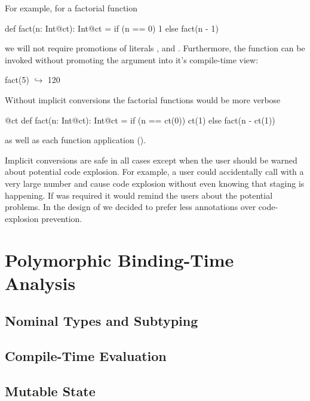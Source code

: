 For example, for a factorial function \begin{lstparagraph}
def fact(n: Int@ct): Int@ct =
  if (n == 0) 1 else fact(n - 1)
 \end{lstparagraph} we will not require promotions of literals , and . Furthermore,
 the function can be invoked without promoting the argument into it's compile-time view:\begin{lstparagraph}
fact(5)
  $\hookrightarrow$ 120
 \end{lstparagraph}

Without implicit conversions the factorial functions would be more verbose \begin{lstparagraph}
@ct def fact(n: Int@ct): Int@ct =
  if (n == ct(0)) ct(1) else fact(n - ct(1))
 \end{lstparagraph} as well as each function application ().

Implicit conversions are safe in all cases except when the user should be warned about potential
code explosion. For example, a user could accidentally call  with a very large number and
cause code explosion without even knowing that staging is happening. If  was required
it would remind the users about the potential problems. In the design of \tool we decided to
prefer less annotations over code-explosion prevention.


\section{Polymorphic Binding-Time Analysis}
\label{sct:bta}

\subsection{Nominal Types and Subtyping}
\label{sct:nominal-types}

\subsection{Compile-Time Evaluation}
\label{sct:evaluation}

\subsection{Mutable State}
\label{sct:mutable-state}
